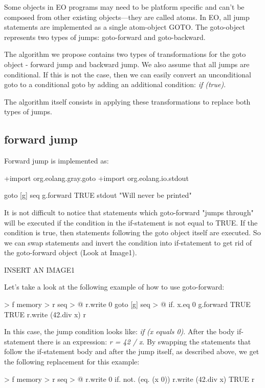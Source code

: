 \documentclass[sigplan,review,11pt,nonacm,natbib=false]{acmart}
\begin{document}
Some objects in EO programs may need to be platform specific and can’t be composed from other existing objects—they are called atoms. 
In EO, all jump statements are implemented as a
single atom-object GOTO. The goto-object represents two types of jumps: goto-forward and goto-backward.

The algorithm we propose contains two types of transformations for the goto object - forward jump and backward jump.
We also assume that all jumps are conditional. If this is not the case, then we can easily convert an unconditional goto to a conditional goto by adding an additional condition: \emph{if (true)}.

The algorithm itself consists in applying these transformations to replace both types of jumps.

\subsection{forward jump}
Forward jump is implemented as:

\begin{ffcode}
+import org.eolang.gray.goto
+import org.eolang.io.stdout

goto
 [g]
  seq
   g.forward TRUE
   stdout "Will never be printed"
\end{ffcode}

It is not difficult to notice that statements which goto-forward "jumps through" will be executed if the condition in the if-statement is not equal to TRUE.
If the condition is true, then statements following the goto object itself are executed.
So we can swap statements and invert the condition into if-statement to get rid of the goto-forward object (Look at Image1).

{INSERT AN IMAGE1}

Let's take a look at the following example of how to use goto-forward:
\begin{ffcode}
[x] > f
 memory > r
 seq > @
  r.write 0
  goto
   [g]
    seq > @
     if.
      x.eq 0
      g.forward TRUE
      TRUE
     r.write (42.div x)
  r
\end{ffcode}

In this case, the jump condition looks like:
\emph{if (x equals 0)}. After the body if-statement there is an expression: \emph{r = 42 / x}. By swapping the statements that follow the if-statement body and after the jump itself, as described above, we get the following replacement for this example:
\begin{ffcode}
[x] > f
 memory > r
 seq > @
  r.write 0
  if.
   not. (eq. (x 0))
   r.write (42.div x)
   TRUE
  r
\end{ffcode}
\end{document}
